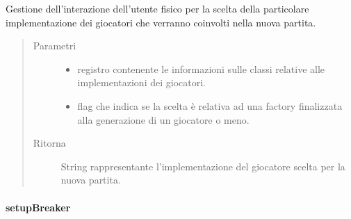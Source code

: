 \documentclass[letterpaper,10pt,italian,openany,oneside]{sphinxmanual}
\begin{document}
\begin{fulllineitems}
\label{\detokenize{test/it/unicam/cs/pa/mastermind/ui/StartView:it.unicam.cs.pa.mastermind.ui.StartView.getPlayerName(PlayerFactoryRegistry, boolean)}}
Gestione dell’interazione dell’utente fisico per la scelta della particolare implementazione dei giocatori che verranno coinvolti nella nuova partita.
\begin{quote}\begin{description}
\item[{Parametri}] \leavevmode\begin{itemize}
\item {} 
 \textendash{} registro contenente le informazioni sulle classi  relative alle implementazioni dei giocatori.

\item {} 
 \textendash{} flag che indica se la scelta è relativa ad una factory finalizzata alla generazione di un giocatore  o meno.

\end{itemize}

\item[{Ritorna}] \leavevmode
String rappresentante l’implementazione del giocatore scelta per la nuova partita.

\end{description}\end{quote}

\end{fulllineitems}



\paragraph{setupBreaker}
\label{\detokenize{test/it/unicam/cs/pa/mastermind/ui/StartView:setupbreaker}}
\end{document}
